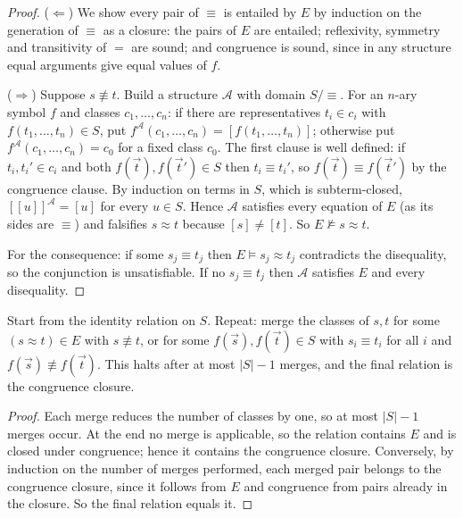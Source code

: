 \begin{proof}
($\Leftarrow$) We show every pair of $\equiv$ is entailed by $E$ by induction on the generation of $\equiv$ as a closure: the pairs of $E$ are entailed; reflexivity, symmetry and transitivity of $=$ are sound; and congruence is sound, since in any structure equal arguments give equal values of $f$.

($\Rightarrow$) Suppose $s\not\equiv t$. Build a structure $\mathcal{A}$ with domain $S/{\equiv}$. For an $n$-ary symbol $f$ and classes $c_1,\dots,c_n$: if there are representatives $t_i\in c_i$ with $f(t_1,\dots,t_n)\in S$, put $f^{\mathcal{A}}(c_1,\dots,c_n)=[f(t_1,\dots,t_n)]$; otherwise put $f^{\mathcal{A}}(c_1,\dots,c_n)=c_0$ for a fixed class $c_0$. The first clause is well defined: if $t_i,t_i'\in c_i$ and both $f(\vec t),f(\vec t')\in S$ then $t_i\equiv t_i'$, so $f(\vec t)\equiv f(\vec t')$ by the congruence clause. By induction on terms in $S$, which is subterm-closed, $[\![u]\!]^{\mathcal{A}}=[u]$ for every $u\in S$. Hence $\mathcal{A}$ satisfies every equation of $E$ (as its sides are $\equiv$) and falsifies $s\approx t$ because $[s]\ne[t]$. So $E\not\models s\approx t$.

For the consequence: if some $s_j\equiv t_j$ then $E\models s_j\approx t_j$ contradicts the disequality, so the conjunction is unsatisfiable. If no $s_j\equiv t_j$ then $\mathcal{A}$ satisfies $E$ and every disequality.
\end{proof}

\begin{proposition}
\label{prop:cc-alg}
Start from the identity relation on $S$. Repeat: merge the classes of $s,t$ for some $(s\approx t)\in E$ with $s\not\equiv t$, or for some $f(\vec s),f(\vec t)\in S$ with $s_i\equiv t_i$ for all $i$ and $f(\vec s)\not\equiv f(\vec t)$. This halts after at most $|S|-1$ merges, and the final relation is the congruence closure.
\end{proposition}

\begin{proof}
Each merge reduces the number of classes by one, so at most $|S|-1$ merges occur. At the end no merge is applicable, so the relation contains $E$ and is closed under congruence; hence it contains the congruence closure. Conversely, by induction on the number of merges performed, each merged pair belongs to the congruence closure, since it follows from $E$ and congruence from pairs already in the closure. So the final relation equals it.
\end{proof}

